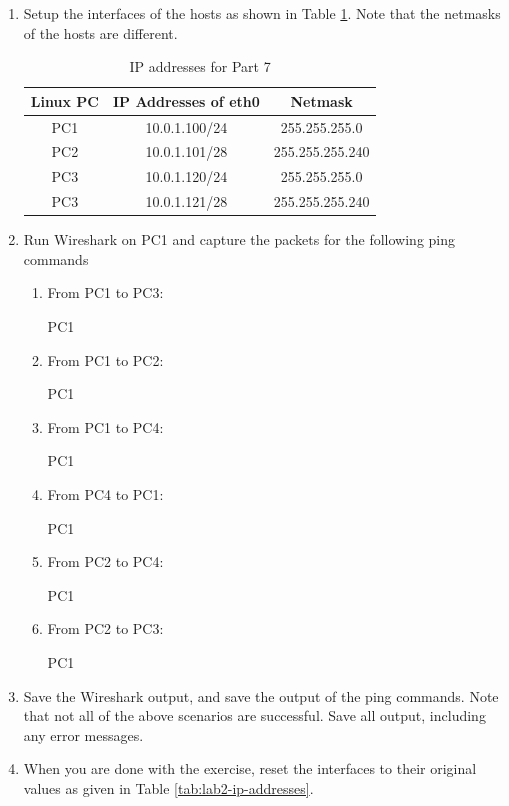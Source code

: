 \begin{enumerate}
	\item Setup the interfaces of the hosts as shown in Table \ref{tab:lab2-ip-addresses-part-7}. Note that the netmasks of the hosts are different.
		\begin{table}[h!t]
			\centering
			\begin{tabular}{| c | c | c |}	
				\hline
				\textbf{Linux PC} & \textbf{IP Addresses of eth0} & \textbf{Netmask} \\ \hline
				PC1 & 10.0.1.100/24 & 255.255.255.0 \\ 
				PC2 & 10.0.1.101/28 & 255.255.255.240 \\
				PC3 & 10.0.1.120/24 & 255.255.255.0 \\
				PC3 & 10.0.1.121/28 & 255.255.255.240 \\ \hline
			\end{tabular}
			\caption{IP addresses for Part 7}
			\label{tab:lab2-ip-addresses-part-7}
		\end{table}
	\item Run Wireshark on PC1 and capture the packets for the following ping commands
		\begin{enumerate}[label=\alph*.]
			\item From PC1 to PC3:
				\begin{cmdblock}
	PC1%
				\end{cmdblock}
			\item From PC1 to PC2:
				\begin{cmdblock}
	PC1%
				\end{cmdblock}
			\item From PC1 to PC4:
				\begin{cmdblock}
	PC1%
				\end{cmdblock}
			\item From PC4 to PC1:
				\begin{cmdblock}
	PC1%
				\end{cmdblock}
			\item From PC2 to PC4:
				\begin{cmdblock}
	PC1%
				\end{cmdblock}
			\item From PC2 to PC3:
				\begin{cmdblock}
	PC1%
				\end{cmdblock}
		\end{enumerate}
	\item Save the Wireshark output, and save the output of the ping commands. Note that not all of the above scenarios are successful. Save all output, including any error messages.
	\item When you are done with the exercise, reset the interfaces to their original values as given in Table \ref{tab:lab2-ip-addresses}.
\end{enumerate}

